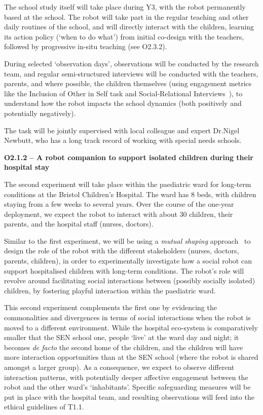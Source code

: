 \begin{rewrite}
The school study itself will take place during Y3, with the robot permanently
based at the school. The robot will take part in the
regular teaching and other daily routines of the school, and will directly
interact with the children, learning its action policy (`when to do what') from
initial co-design with the teachers, followed by progressive in-situ teaching (see
O2.3.2).

During selected `observation days', observations will be conducted by the
research team, and regular semi-structured interviews will be conducted with the
teachers, parents, and where possible, the children themselves (using engagement
metrics like the Inclusion of Other in Self task and Social-Relational
Interviews~\cite{westlund2017measuring}), to understand how the robot impacts
the school dynamics  (both positively and potentially negatively).

The task will be jointly supervised with local colleague and expert Dr.Nigel Newbutt,
who has a long track record of working with special needs schools.

\textbf{O2.1.2 -- A robot companion to support isolated children during their
hospital stay}

The second experiment will take place within the paediatric ward for long-term
conditions at the Bristol Children's Hospital. The ward has 8 beds, with
children staying from a few weeks to several years. Over the course of the
one-year deployment, we expect the robot to interact with about 30 children,
their parents, and the hospital staff (nurses, doctors).

Similar to the first experiment, we will be using a \emph{mutual shaping}
approach~\cite{winkle2018social} to design the role of the robot with the
different stakeholders (nurses, doctors, parents, children), in order to
experimentally investigate how a social robot can support hospitalised children
with long-term conditions. The robot's role will revolve around facilitating
social interactions between (possibly socially isolated) children, by fostering
playful interaction within the paediatric ward.

This second experiment complements the first one by evidencing the commonalities
and divergences in terms of social interactions when the robot is moved to a
different environment. While the hospital eco-system is comparatively smaller that the SEN school one,
people `live' at the ward day and night; it becomes \emph{de facto} the second home of the
children, and the children will have more interaction opportunities than at the
SEN school (where the robot is shared amongst a larger group). As a consequence,
we expect to observe different interaction patterns, with potentially deeper
affective engagement between the robot and the other ward's `inhabitants'.
Specific safeguarding measures will be put in place with the hospital team, and
resulting observations will feed into the ethical guidelines of T1.1.

\end{rewrite}


